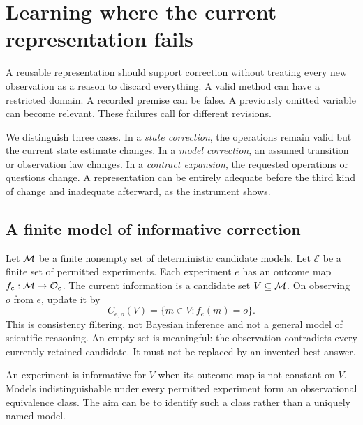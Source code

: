 \section{Learning where the current representation fails}\label{MU:sec:revision}
A reusable representation should support correction without treating every new observation as a reason to discard everything. A valid method can have a restricted domain. A recorded premise can be false. A previously omitted variable can become relevant. These failures call for different revisions.

We distinguish three cases. In a \emph{state correction}, the operations remain valid but the current state estimate changes. In a \emph{model correction}, an assumed transition or observation law changes. In a \emph{contract expansion}, the requested operations or questions change. A representation can be entirely adequate before the third kind of change and inadequate afterward, as the instrument shows.

\subsection{A finite model of informative correction}
Let $\mathcal M$ be a finite nonempty set of deterministic candidate models. Let $\mathcal E$ be a finite set of permitted experiments. Each experiment $e$ has an outcome map $f_e:\mathcal M\to\mathcal O_e$. The current information is a candidate set $V\subseteq\mathcal M$. On observing $o$ from $e$, update it by
\begin{equation}\label{MU:eq:filter}
C_{e,o}(V)=\{m\in V:f_e(m)=o\}.
\end{equation}
This is consistency filtering, not Bayesian inference and not a general model of scientific reasoning. An empty set is meaningful: the observation contradicts every currently retained candidate. It must not be replaced by an invented best answer.

An experiment is informative for $V$ when its outcome map is not constant on $V$. Models indistinguishable under every permitted experiment form an observational equivalence class. The aim can be to identify such a class rather than a uniquely named model.

